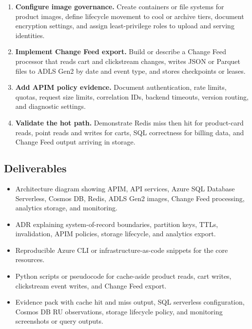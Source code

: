 \begin{enumerate}
    \item \textbf{Configure image governance.} Create containers or file systems for product images, define lifecycle movement to cool or archive tiers, document encryption settings, and assign least-privilege roles to upload and serving identities.
    \item \textbf{Implement Change Feed export.} Build or describe a Change Feed processor that reads cart and clickstream changes, writes JSON or Parquet files to ADLS Gen2 by date and event type, and stores checkpoints or leases.
    \item \textbf{Add APIM policy evidence.} Document authentication, rate limits, quotas, request size limits, correlation IDs, backend timeouts, version routing, and diagnostic settings.
    \item \textbf{Validate the hot path.} Demonstrate Redis miss then hit for product-card reads, point reads and writes for carts, SQL correctness for billing data, and Change Feed output arriving in storage.
\end{enumerate}

\subsection*{Deliverables}
\begin{itemize}
    \item Architecture diagram showing APIM, API services, Azure SQL Database Serverless, Cosmos DB, Redis, ADLS Gen2 images, Change Feed processing, analytics storage, and monitoring.
    \item ADR explaining system-of-record boundaries, partition keys, TTLs, invalidation, APIM policies, storage lifecycle, and analytics export.
    \item Reproducible Azure CLI or infrastructure-as-code snippets for the core resources.
    \item Python scripts or pseudocode for cache-aside product reads, cart writes, clickstream event writes, and Change Feed export.
    \item Evidence pack with cache hit and miss output, SQL serverless configuration, Cosmos DB RU observations, storage lifecycle policy, and monitoring screenshots or query outputs.
\end{itemize}

